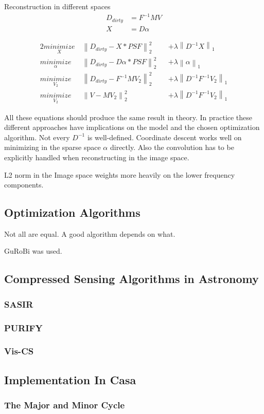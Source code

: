 Reconstruction in different spaces
\begin{equation}
\begin{split}
D_{dirty} &= F^{-1}MV \\
X &= D\alpha
\end{split}
\end{equation}

\begin{alignat*}{2}
	\underset{X}{minimize} \:& \left \| D_{dirty} - X \ast PSF \right \|_2^2 &&+  \lambda \left \| D^{-1}X \right \|_1 \\
	\underset{\alpha}{minimize} \:& \left \| D_{dirty} - D\alpha \ast PSF \right \|_2^2 &&+ \lambda \left \| \alpha \right \|_1 \\
	\underset{V_2}{minimize} \:& \left \| D_{dirty} - F^{-1} M V_2 \right \|_2^2 &&+ \lambda \left \| D^{-1}F^{-1}V_2\right \|_1 \\
	\underset{V_2}{minimize} \:& \left \| V - M V_2 \right \|_2^2 &&+ \lambda \left \| D^{-1}F^{-1}V_2\right \|_1
\end{alignat*}

All these equations should produce the same result in theory. In practice these different approaches have implications on the model and the chosen optimization algorithm. Not every $D^{-1}$ is well-defined. Coordinate descent works well on minimizing in the sparse space $\alpha$ directly. Also the convolution has to be explicitly handled when reconstructing in the image space.

L2 norm in the Image space weights more heavily on the lower frequency components.

\subsection{Optimization Algorithms}

Not all are equal. A good algorithm depends on what.

GuRoBi was used.


\subsection{Compressed Sensing Algorithms in Astronomy}

\subsubsection{SASIR}

\subsubsection{PURIFY}

\subsubsection{Vis-CS}



\subsection{Implementation In Casa}

\subsubsection{The Major and Minor Cycle}
